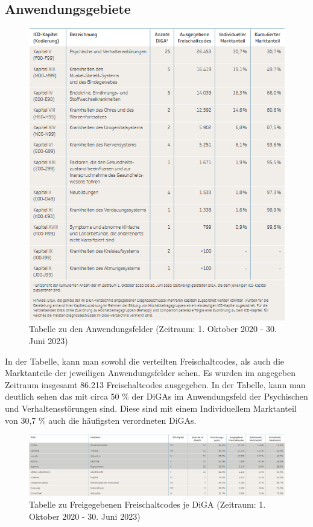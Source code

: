 \documentclass{article}
\begin{document}
		\subsection{Anwendungsgebiete}
			\begin{figure}[htbp]
				\includegraphics[height=0.5\textheight]{./grafiken/tabelle_anwendungsfelder_diga}
				\caption[Anwendungsfelder der DiGA]{Tabelle zu den Anwendungsfelder (Zeitraum: 1. Oktober 2020 - 30. Juni 2023)}
				\label{Tab-anwendungsfelder-diga}
			\end{figure}
			In der Tabelle, kann man sowohl die verteilten Freischaltcodes, als auch die Marktanteile der jeweiligen Anwendungsfelder sehen. Es wurden im angegeben Zeitraum insgesamt 86.213 Freischaltcodes ausgegeben. In der Tabelle, kann man deutlich sehen das mit circa 50 \% der DiGAs im Anwendungsfeld der Psychischen und Verhaltensstörungen sind. Diese sind mit einem Individuellem Marktanteil von 30,7 \% auch die häufigsten verordneten DiGAs.
			\newpage
			\begin{figure}[htbp]
				\includegraphics[width=\textwidth]{./grafiken/tab_diga_verteilung}
				\caption[Freigegebene Freischaltcode je DiGA]{Tabelle zu Freigegebenen Freischaltcodes je DiGA (Zeitraum: 1. Oktober 2020 - 30. Juni 2023)}
				\label{Tab-freischaltcodes-je-diga}
			\end{figure}
\end{document}
